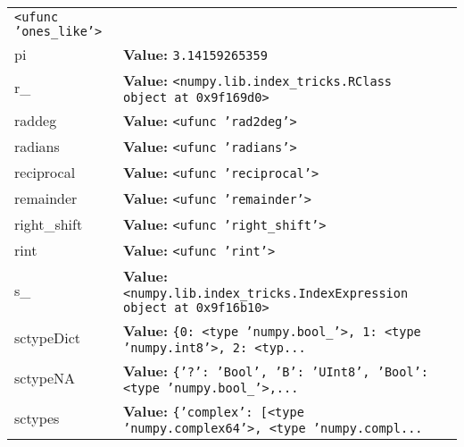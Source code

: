 \begin{longtable}{|p{\varnamewidth}|p{\vardescrwidth}|l}
{\tt {\textless}ufunc 'ones\_like'{\textgreater}}&\\
\cline{1-2}
\raggedright p\-i\- & \raggedright \textbf{Value:} 
{\tt 3.14159265359}&\\
\cline{1-2}
\raggedright r\-\_\- & \raggedright \textbf{Value:} 
{\tt {\textless}numpy.lib.index\_tricks.RClass object at 0x9f169d0{\textgreater}}&\\
\cline{1-2}
\raggedright r\-a\-d\-2\-d\-e\-g\- & \raggedright \textbf{Value:} 
{\tt {\textless}ufunc 'rad2deg'{\textgreater}}&\\
\cline{1-2}
\raggedright r\-a\-d\-i\-a\-n\-s\- & \raggedright \textbf{Value:} 
{\tt {\textless}ufunc 'radians'{\textgreater}}&\\
\cline{1-2}
\raggedright r\-e\-c\-i\-p\-r\-o\-c\-a\-l\- & \raggedright \textbf{Value:} 
{\tt {\textless}ufunc 'reciprocal'{\textgreater}}&\\
\cline{1-2}
\raggedright r\-e\-m\-a\-i\-n\-d\-e\-r\- & \raggedright \textbf{Value:} 
{\tt {\textless}ufunc 'remainder'{\textgreater}}&\\
\cline{1-2}
\raggedright r\-i\-g\-h\-t\-\_\-s\-h\-i\-f\-t\- & \raggedright \textbf{Value:} 
{\tt {\textless}ufunc 'right\_shift'{\textgreater}}&\\
\cline{1-2}
\raggedright r\-i\-n\-t\- & \raggedright \textbf{Value:} 
{\tt {\textless}ufunc 'rint'{\textgreater}}&\\
\cline{1-2}
\raggedright s\-\_\- & \raggedright \textbf{Value:} 
{\tt {\textless}numpy.lib.index\_tricks.IndexExpression object at 0x9f16b10{\textgreater}}&\\
\cline{1-2}
\raggedright s\-c\-t\-y\-p\-e\-D\-i\-c\-t\- & \raggedright \textbf{Value:} 
{\tt \texttt{\{}0\texttt{: }{\textless}type 'numpy.bool\_'{\textgreater}\texttt{, }1\texttt{: }{\textless}type 'numpy.int8'{\textgreater}\texttt{, }2\texttt{: }{\textless}typ\texttt{...}}&\\
\cline{1-2}
\raggedright s\-c\-t\-y\-p\-e\-N\-A\- & \raggedright \textbf{Value:} 
{\tt \texttt{\{}\texttt{'}\texttt{?}\texttt{'}\texttt{: }\texttt{'}\texttt{Bool}\texttt{'}\texttt{, }\texttt{'}\texttt{B}\texttt{'}\texttt{: }\texttt{'}\texttt{UInt8}\texttt{'}\texttt{, }\texttt{'}\texttt{Bool}\texttt{'}\texttt{: }{\textless}type 'numpy.bool\_'{\textgreater}\texttt{,}\texttt{...}}&\\
\cline{1-2}
\raggedright s\-c\-t\-y\-p\-e\-s\- & \raggedright \textbf{Value:} 
{\tt \texttt{\{}\texttt{'}\texttt{complex}\texttt{'}\texttt{: }\texttt{[}{\textless}type 'numpy.complex64'{\textgreater}\texttt{, }{\textless}type 'numpy.compl\texttt{...}}&\\

\end{longtable}
